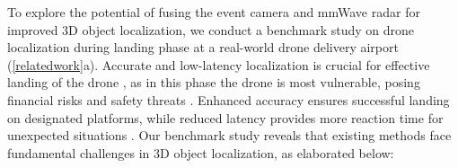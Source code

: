 


To explore the potential of fusing the event camera and mmWave radar for improved 3D object localization, we conduct a benchmark study on drone localization during landing phase at a real-world drone delivery airport (\fig \ref{relatedwork}a). 
Accurate and low-latency localization is crucial for effective landing of the drone \cite{wang2022micnest, sun2023indoor}, as in this phase the drone is most vulnerable, posing financial risks and safety threats \cite{floreano2015science, Russiandrone}. 
Enhanced accuracy ensures successful landing on designated platforms, while reduced latency provides more reaction time for unexpected situations \cite{famili2022pilot, he2023acoustic, chi2022wi}.
Our benchmark study reveals that existing methods face fundamental challenges in 3D object localization, as elaborated below:

